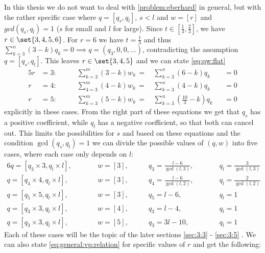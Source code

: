 In this thesis we do not want to deal with \autoref{problem:eberhard} in general, but with the rather specific case where $q = [q_s, q_l]$, $s < l$ and $w = [r]$ and $gcd(q_s, q_l) = 1$ ($s$ for small and $l$ for large). Since $t \in \left[\frac{1}{3}, \frac{2}{3}\right]$, we have $r \in \set{3, 4, 5, 6}$. For $r = 6$ we have $t = \frac{1}{3}$ and thus $\sum_{k=3}^n \left(3 - k \right) q_k = 0 \implies q = (q_3, 0, 0, \dots)$, contradicting the assumption $q = [q_s, q_l]$. This leaves $r \in \set{3, 4, 5}$ and we can state \eqref{eq:qw:flat} 
\begin{alignat}{5}
  r &= 3: \qquad &  \sum_{k=3}^m \left(3 - k \right) w_k\,=\,&    \sum_{k=3}^n \left(6 - k \right) q_k &&= 0 \label{eq:flat:3}\\
  r &= 4: \qquad &  \sum_{4=3}^m \left(4 - k \right) w_k\,=\,&    \sum_{k=3}^n \left(4 - k \right) q_k &&= 0  \label{eq:flat:4}\\
  r &= 5: \qquad &  \sum_{k=3}^m \left(5 - k \right) w_k\,=\,&    \sum_{k=3}^n \left( \tfrac{10}{3} - k \right) q_k &&= 0 \label{eq:flat:5}
\end{alignat}
explicitly in these cases. From the right part of these equations we get that $q_s$ has a positive coefficient, while $q_l$ has a negative coefficient, so that both can cancel out. This limits the possibilities for $s$ and based on these equations and the condition $\gcd(q_s, q_l) = 1$ we can divide the possible values of $(q, w)$ into five cases, where each case only depends on $l$:
\begin{alignat*}{6}
  q = [q_3 \times 3, q_l \times l],\qquad&&w = [3],\qquad&q_3 = \tfrac{l - 6}{\gcd(l, 3)}, &\qquad&q_l = \tfrac{3}{\gcd(l, 3)} \\
  q = [q_4 \times 4, q_l \times l],\qquad&&w = [3],\qquad&q_4 = \tfrac{l - 6}{\gcd(l, 2)}, &\qquad&q_l = \tfrac{2}{\gcd(l, 2)} \\
  q = [q_5 \times 5, q_l \times l],\qquad&&w = [3],\qquad&q_5 = l - 6,                     &\qquad&q_l = 1 \\
  q = [q_3 \times 3, q_l \times l],\qquad&&w = [4],\qquad&q_3 = l - 4,                     &\qquad&q_l = 1 \\
  q = [q_3 \times 3, q_l \times l],\qquad&&w = [5],\qquad&q_3 = 3l - 10,                   &\qquad&q_l = 1
\end{alignat*}
Each of these cases will be the topic of the later sections \autoref{sec:3:3} - \autoref{sec:3:5} . We can also state \eqref{eq:general:vp:relation} for specific values of $r$ and get the following:

